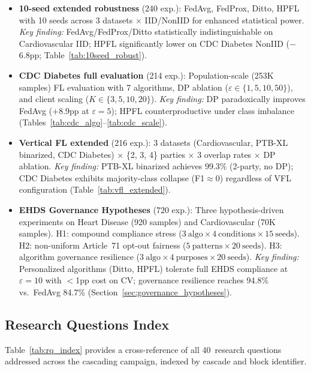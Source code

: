 \documentclass[conference]{IEEEtran}
\begin{document}
\begin{itemize}
    \item \textbf{10-seed extended robustness} (240 exp.): FedAvg, FedProx, Ditto, HPFL with 10 seeds across 3 datasets $\times$ IID/NonIID for enhanced statistical power. \textit{Key finding:} FedAvg/FedProx/Ditto statistically indistinguishable on Cardiovascular IID; HPFL significantly lower on CDC Diabetes NonIID ($-$6.8pp; Table~\ref{tab:10seed_robust}).
    \item \textbf{CDC Diabetes full evaluation} (214 exp.): Population-scale (253K samples) FL evaluation with 7 algorithms, DP ablation ($\varepsilon{\in}\{1, 5, 10, 50\}$), and client scaling ($K{\in}\{3, 5, 10, 20\}$). \textit{Key finding:} DP paradoxically improves FedAvg ($+$8.9pp at $\varepsilon{=}5$); HPFL counterproductive under class imbalance (Tables~\ref{tab:cdc_algo}--\ref{tab:cdc_scale}).
    \item \textbf{Vertical FL extended} (216 exp.): 3 datasets (Cardiovascular, PTB-XL binarized, CDC Diabetes) $\times$ \{2, 3, 4\} parties $\times$ 3 overlap rates $\times$ DP ablation. \textit{Key finding:} PTB-XL binarized achieves 99.3\% (2-party, no DP); CDC Diabetes exhibits majority-class collapse (F1$\approx$0) regardless of VFL configuration (Table~\ref{tab:vfl_extended}).
    \item \textbf{EHDS Governance Hypotheses} (720 exp.): Three hypothesis-driven experiments on Heart Disease (920 samples) and Cardiovascular (70K samples). H1: compound compliance stress ($3~\text{algo} \times 4~\text{conditions} \times 15~\text{seeds}$). H2: non-uniform Article~71 opt-out fairness ($5~\text{patterns} \times 20~\text{seeds}$). H3: algorithm governance resilience ($3~\text{algo} \times 4~\text{purposes} \times 20~\text{seeds}$). \textit{Key finding:} Personalized algorithms (Ditto, HPFL) tolerate full EHDS compliance at $\varepsilon{=}10$ with $<$1pp cost on CV; governance resilience reaches 94.8\% vs.\ FedAvg 84.7\% (Section~\ref{sec:governance_hypotheses}).
\end{itemize}

\subsection{Research Questions Index}

Table~\ref{tab:rq_index} provides a cross-reference of all 40~research questions addressed across the cascading campaign, indexed by cascade and block identifier.
\end{document}
